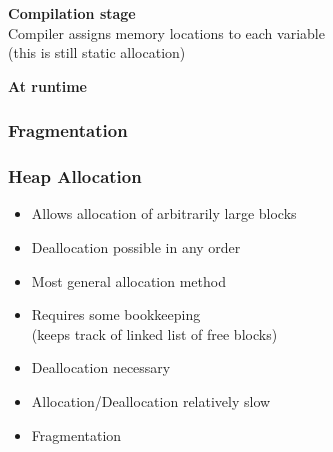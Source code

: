 \documentclass{../ucll-slides}
\newenvironment{procontralist}{
  \begingroup
  \newcommand{\pro}{\item[\Checkmark]}
  \newcommand{\con}{\item[\XSolidBrush]}
  \begin{itemize}
  }{
  \end{itemize}
  \endgroup}
\begin{document}
\begin{frame}
\begin{columns}
\begin{center}
    \end{center}
  \end{columns}
  \vskip2cm
  \begin{overprint}
    \begin{center}
      \textbf{Compilation stage} \\ Compiler assigns memory locations to each variable \\ (this is still static allocation)
    \end{center}

    \begin{center}
      \textbf{At runtime}
    \end{center}
  \end{overprint}
\end{frame}

\begin{frame}
  \frametitle{Fragmentation}
  \begin{center}
  \end{center}
\end{frame}

\begin{frame}
  \frametitle{Heap Allocation}
  \begin{procontralist}
    \pro Allows allocation of arbitrarily large blocks
    \pro Deallocation possible in any order
    \pro Most general allocation method
    \con Requires some bookkeeping \\ (keeps track of linked list of free blocks)
    \con Deallocation necessary
    \con Allocation/Deallocation relatively slow
    \con Fragmentation
  \end{procontralist}
\end{frame}
\end{document}
